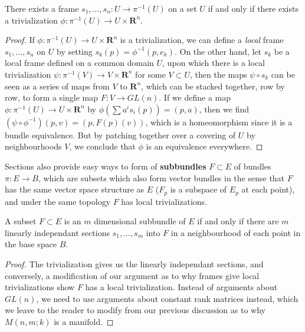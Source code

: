 \begin{theorem}
    There exists a frame $s_1, \dots, s_n: U \to \pi^{-1}(U)$ on a set $U$ if and only if there exists a trivialization $\phi: \pi^{-1}(U) \to U \times \mathbf{R}^n$.
\end{theorem}
\begin{proof}
    If $\phi: \pi^{-1}(U) \to U \times \mathbf{R}^n$ is a trivialization, we can define a {\it local} frame $s_1, \dots, s_n$ on $U$ by setting $s_k(p) = \phi^{-1}(p,e_k)$. On the other hand, let $s_k$ be a local frame defined on a common domain $U$, upon which there is a local trivialization $\psi: \pi^{-1}(V) \to V \times \mathbf{R}^n$ for some $V \subset U$, then the maps $\psi \circ s_k$ can be seen as a series of maps from $V$ to $\mathbf{R}^n$, which can be stacked together, row by row, to form a single map $F: V \to GL(n)$. If we define a map $\phi: \pi^{-1}(U) \to U \times \mathbf{R}^n$ by $\phi(\sum a^i s_i(p)) = (p,a)$, then we find $(\psi \circ \phi^{-1})(p,v) = (p,F(p)(v))$, which is a homeomorphism since it is a bundle equivalence. But by patching together over a covering of $U$ by neighbourhoods $V$, we conclude that $\phi$ is an equivalence everywhere.
\end{proof}

Sections also provide easy ways to form of {\bf subbundles} $F \subset E$ of bundles $\pi: E \to B$, which are subsets which also form vector bundles in the sense that $F$ has the same vector space structure as $E$ ($F_p$ is a subspace of $E_p$ at each point), and under the same topology $F$ has local trivializations.

\begin{theorem}
    A subset $F \subset E$ is an $m$ dimensional subbundle of $E$ if and only if there are $m$ linearly independant sections $s_1, \dots, s_m$ into $F$ in a neighbourhood of each point in the base space $B$.
\end{theorem}
\begin{proof}
    The trivialization gives us the linearly independant sections, and conversely, a modification of our argument as to why frames give local trivializations show $F$ has a local trivialization. Instead of arguments about $GL(n)$, we need to use arguments about constant rank matrices instead, which we leave to the reader to modify from our previous discussion as to why $M(n,m;k)$ is a manifold.
\end{proof}

